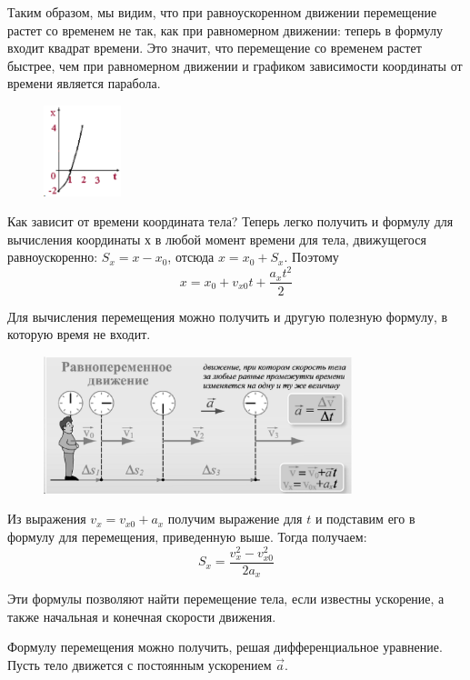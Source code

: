 \documentclass[a6paper, 11pt]{diss_4}
\renewcommand{\'}{\,'}
\begin{document}
  Таким образом, мы видим, что при равноускоренном движении перемещение
растет со временем не так, как при равномерном движении: теперь в формулу
входит квадрат времени. Это значит, что перемещение со временем растет быстрее,
чем при равномерном движении и графиком зависимости координаты от времени
является парабола.

\begin{figure}
\includegraphics[width=0.2\textwidth]{img/eps13.eps}
\caption{}
\label{fig13}
\end{figure}


  Как зависит от времени координата тела? Теперь легко получить и формулу
для вычисления координаты $х$ в любой момент времени для тела, движущегося
равноускоренно: $S_x=x-x_0$, отсюда $x=x_0+S_x$. Поэтому
\[x=x_0+v_{x0}t+\frac{a_x t^2}{2}\]

  Для вычисления перемещения можно получить и другую полезную формулу, в
которую время не входит.
\begin{figure}
\begin{center}
  \includegraphics[width=0.8\textwidth]{img/img14.eps}\\
  \caption{}\label{img14}
\end{center}
\end{figure}
Из выражения $v_x=v_{x0}+a_x$ получим выражение для
$t$ и подставим его в формулу для перемещения, приведенную выше. Тогда
получаем:
\[S_x=\frac{v_x^2-v_{x0}^2}{2a_x}\]


  Эти формулы позволяют найти перемещение тела, если известны ускорение,
а также начальная и конечная скорости движения.

  Формулу перемещения можно получить, решая дифференциальное уравнение.
Пусть тело движется с постоянным ускорением $\vec{a}$.
\end{document}
